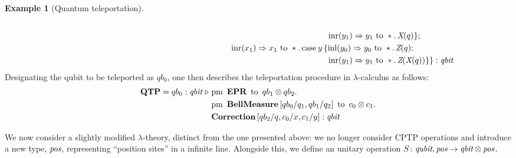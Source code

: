 \documentclass[10pt,a4paper]{amsart}
\theoremstyle{definition}
\theoremstyle{definition}
\newtheorem{example}[definition]{Example}
\theoremstyle{definition}
\theoremstyle{definition}
\theoremstyle{definition}
\theoremstyle{definition}
\begin{document}
\begin{example}[Quantum teleportation]
\begin{align*}
                \\
   &   \hspace{333pt} \inr (y_{1}) \Rightarrow y_1 \text{ to } \ast. \, \emph{X}
(q)\} ; \\ 
   & \hspace{215pt}\inr (x_{1})  \Rightarrow x_1 \text{ to } \ast. \,
        \text{case}\hspace{2pt} y\,  \{\inl (y_{0})  \Rightarrow
        y_0 \text{ to } \ast. \, \emph{Z}(q);  
\\ 
   &\hspace{333pt} \inr (y_{1}) \Rightarrow{} y_1 \text{ to } \ast. \, \emph{Z}
(\emph{X}(q)) \}\} : \emph{qbit}
\end{align*}
Designating the qubit to be teleported as $qb_0$, one then describes the
teleportation procedure in $\lambda$-calculus as follows:
 \begin{align*}
  \textbf{QTP} = qb_{0}: \textit{qbit}\hspace{3 pt} \triangleright \hspace{3 pt} & \text{pm} \hspace{5pt} \textbf{EPR} \hspace{5pt} \text{to} \hspace{5pt}  qb_{1} \otimes qb_{2}.  \notag \\
     & \text{pm}\hspace{5pt} \textbf{BellMeasure}\, [qb_0/q_1,qb_{1}/q_2] \hspace{5pt}  \text{to} \hspace{5pt} c_{0}\otimes c_{1} . \notag \\
     & \textbf{Correction}\, [qb_{2}/q,c_{0}/x, c_{1}/y] 
     : \emph{qbit} 
 \end{align*}

\end{example}

We now consider a slightly modified $\lambda$-theory, distinct from the one presented above: we no longer consider CPTP operations and introduce a new type, $\emph{pos}$, representing ``position sites'' in a infinite line. Alongside this, we define an unitary operation $S\colon \emph{qubit}, \emph{pos} \to \emph{qbit} \otimes \emph{pos}$.
\end{document}

